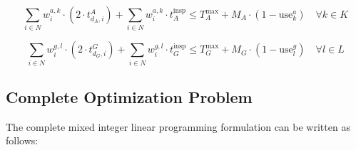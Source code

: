 \documentclass{article}
\begin{document}
				\begin{equation}
					\sum_{i \in N} w_i^{a,k} \cdot \left( 2 \cdot t_{d_A,i}^{A}\right) + \sum_{i \in N} w_i^{a,k} \cdot t_A^{\text{insp}} \leq T_A^{\max} + M_A \cdot (1 - \text{use}_k^a) \quad \forall k \in K
				\end{equation}


				\begin{equation}
					\sum_{i \in N} w_i^{g,l} \cdot \left( 2 \cdot t_{d_G,i}^{G}\right) + \sum_{i \in N} w_i^{g,l} \cdot t_G^{\text{insp}} \leq T_G^{\max} + M_G \cdot (1 - \text{use}_l^g) \quad \forall l \in L
				\end{equation}


		\subsection{Complete Optimization Problem}

		The complete mixed integer linear programming formulation can be written as follows:
\end{document}
